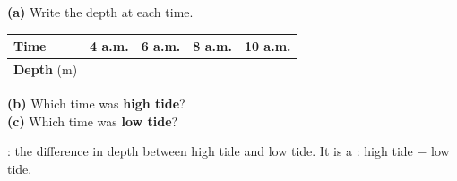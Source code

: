 \documentclass[12pt,a4paper]{article}
\newif\iffr
\newcommand{\fr}[1]{\unskip\iffr\par\nobreak\vspace{1pt}\noindent{\small\itshape\color{black!60}#1}\par\fi}
\newcommand{\frin}[1]{\unskip\iffr\ {\small\itshape\color{black!60}(#1)}\fi}
\newcommand{\tall}{\rule[-0.6em]{0pt}{1.9em}}
\renewcommand{\tall}{\rule[-0.8em]{0pt}{2.4em}}
\begin{document}
\begin{minipage}{\textwidth}
\begin{minipage}[c]{0.66\textwidth}
\vspace{6pt}
\noindent\textbf{(a)} Write the depth at each time.
\fr{(a) \'Ecris la profondeur \`a chaque heure.}

\vspace{4pt}
{\setlength{\tabcolsep}{4pt}%
\begin{tabular}{|l|C{1.45cm}|C{1.45cm}|C{1.45cm}|C{1.45cm}|}
  \hline
  \textbf{Time} & 4 a.m. & 6 a.m. & 8 a.m. & 10 a.m. \\ \hline
  \textbf{Depth} (m) \tall & & & & \\ \hline
\end{tabular}}

\vspace{8pt}
\noindent\textbf{(b)} Which time was \textbf{high tide}? \frin{mar\'ee haute} \hfill
\blank[2.2cm] \\[6pt]
\textbf{(c)} Which time was \textbf{low tide}? \frin{mar\'ee basse} \hfill
\blank[2.2cm]
\end{minipage}
\end{minipage}


\begin{remember}
  : the difference in depth between high tide and low tide.
  \quad It is a : \; high tide $-$ low tide.
  \fr{Le marnage (\eng{tidal range})~: la diff\'erence de profondeur entre la mar\'ee
  haute et la mar\'ee basse. C'est une soustraction~: mar\'ee haute $-$ mar\'ee
  basse.}
\end{remember}
\end{document}

